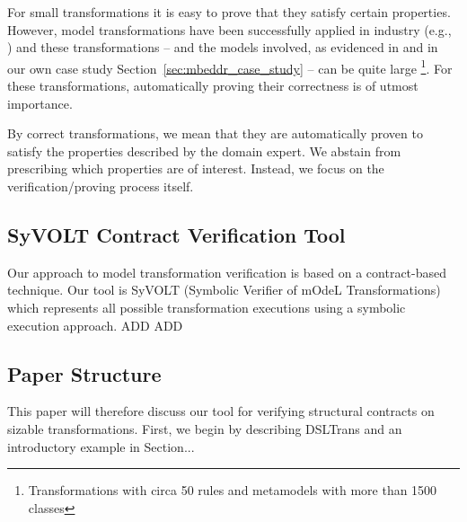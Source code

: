 For small transformations it is easy to prove that they satisfy certain
properties. However, model transformations have been successfully applied in
industry (e.g., \cite{daghsen:hal-00660252,Giese2010}) and these transformations
-- and the models involved, as evidenced in \cite{Selim2012} and in our own case
study Section~\ref{sec:mbeddr_case_study} -- can be quite large
\footnote{Transformations with circa 50 rules and metamodels with more than 1500
classes}.
For these transformations, automatically proving their correctness is of
utmost importance.

By correct transformations, we mean that they are automatically proven to satisfy the properties described by the domain expert. We abstain from prescribing which properties are of interest. Instead, we focus on the verification/proving process itself.

\subsection{SyVOLT Contract Verification Tool}

Our approach to model transformation verification is based on a contract-based technique. Our tool is SyVOLT (Symbolic Verifier of mOdeL Transformations) which represents all possible transformation executions using a symbolic execution approach. ADD ADD

\subsection{Paper Structure}

This paper will therefore discuss our tool for verifying structural contracts on sizable transformations. First, we begin by describing DSLTrans and an introductory example in Section...

